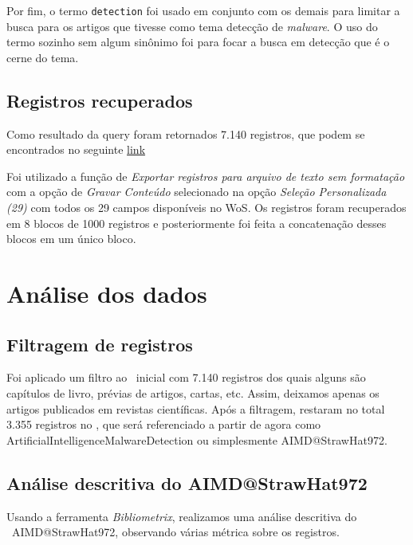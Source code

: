 Por fim, o termo \texttt{detection} foi usado em conjunto com os demais para limitar a busca para os artigos que tivesse como tema detecção de \textit{malware}. O uso do termo sozinho sem algum sinônimo foi para focar a busca em detecção que é o cerne do tema.

\subsection{Registros recuperados}

Como resultado da query foram retornados 7.140 registros, que podem se encontrados no seguinte \href{https://github.com/jhcf/Comput-Experim-20212/tree/main/experiments/StrawHat972/PesqBibliogr/IA-DeteccaoMalware/WoS-20220209/Registros}{link}

Foi utilizado a função de \textit{Exportar registros para arquivo de texto sem formatação} com a opção de \textit{Gravar Conteúdo} selecionado na opção \textit{Seleção Personalizada (29)} com todos os 29 campos disponíveis no WoS. Os registros foram recuperados em 8 blocos de 1000 registros e posteriormente foi feita a concatenação desses blocos em um único bloco.

\section{Análise dos dados}

\subsection{Filtragem de registros}

Foi aplicado um filtro ao \dataset\ inicial com 7.140 registros dos quais alguns são capítulos de livro, prévias de artigos, cartas, etc. Assim, deixamos apenas os artigos publicados em revistas científicas. Após a filtragem, restaram no total 3.355 registros no \dataset, que será referenciado a partir de agora como ArtificialIntelligenceMalwareDetection ou simplesmente AIMD@StrawHat972.

\subsection{ Análise descritiva do \dataset AIMD@StrawHat972}

Usando a ferramenta \textit{Bibliometrix}, realizamos uma análise descritiva do \dataset\ AIMD@StrawHat972, observando várias métrica sobre os registros.

